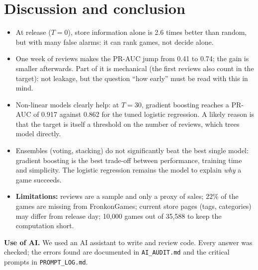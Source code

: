 \documentclass[11pt,a4paper]{article}
\newcommand{\code}[1]{\texttt{#1}}
\begin{document}
\section{Discussion and conclusion}
\begin{itemize}
  \item At release ($T = 0$), store information alone is 2.6 times better than random, but with many false
        alarms: it can rank games, not decide alone.
  \item One week of reviews makes the PR-AUC jump from 0.41 to 0.74; the gain is smaller afterwards.
        Part of it is mechanical (the first reviews also count in the target): not leakage, but the
        question ``how early'' must be read with this in mind.
  \item Non-linear models clearly help: at $T = 30$, gradient boosting reaches a PR-AUC of 0.917 against
        0.862 for the tuned logistic regression. A likely reason is that the target is itself a threshold
        on the number of reviews, which trees model directly.
  \item Ensembles (voting, stacking) do not significantly beat the best single model: gradient boosting
        is the best trade-off between performance, training time and simplicity. The logistic regression
        remains the model to explain \emph{why} a game succeeds.
  \item \textbf{Limitations:} reviews are a sample and only a proxy of sales; 22\% of the games are missing
        from FronkonGames; current store pages (tags, categories) may differ from release day;
        10{,}000 games out of 35{,}588 to keep the computation short.
\end{itemize}

\textbf{Use of AI.} We used an AI assistant to write and review code. Every answer was checked;
the errors found are documented in \code{AI\_AUDIT.md} and the critical prompts in \code{PROMPT\_LOG.md}.

\end{document}
